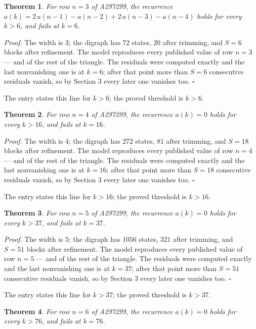 \documentclass[11pt]{article}
\newtheorem{theorem}{Theorem}
\theoremstyle{definition}
\begin{document}
\begin{theorem} For row $n = 3$ of A297299, the recurrence $a(k) = 2\,a(n-1) - a(n-2) + 2\,a(n-3) - a(n-4)$ holds for every $k > 6$, and fails at $k = 6$.\end{theorem}

{\itshape Proof.} The width is $3$; the digraph has $72$ states, $20$ after trimming, and $S = 6$ blocks after refinement. The model reproduces every published value of row $n = 3$ --- and of the rest of the triangle. The residuals were computed exactly and the last nonvanishing one is at $k = 6$; after that point more than $S = 6$ consecutive residuals vanish, so by Section 3 every later one vanishes too. $\square$

The entry states this line for $k > 6$; the proved threshold is $k > 6$.

\begin{theorem} For row $n = 4$ of A297299, the recurrence $a(k) = 0$ holds for every $k > 16$, and fails at $k = 16$.\end{theorem}

{\itshape Proof.} The width is $4$; the digraph has $272$ states, $81$ after trimming, and $S = 18$ blocks after refinement. The model reproduces every published value of row $n = 4$ --- and of the rest of the triangle. The residuals were computed exactly and the last nonvanishing one is at $k = 16$; after that point more than $S = 18$ consecutive residuals vanish, so by Section 3 every later one vanishes too. $\square$

The entry states this line for $k > 16$; the proved threshold is $k > 16$.

\begin{theorem} For row $n = 5$ of A297299, the recurrence $a(k) = 0$ holds for every $k > 37$, and fails at $k = 37$.\end{theorem}

{\itshape Proof.} The width is $5$; the digraph has $1056$ states, $321$ after trimming, and $S = 51$ blocks after refinement. The model reproduces every published value of row $n = 5$ --- and of the rest of the triangle. The residuals were computed exactly and the last nonvanishing one is at $k = 37$; after that point more than $S = 51$ consecutive residuals vanish, so by Section 3 every later one vanishes too. $\square$

The entry states this line for $k > 37$; the proved threshold is $k > 37$.

\begin{theorem} For row $n = 6$ of A297299, the recurrence $a(k) = 0$ holds for every $k > 76$, and fails at $k = 76$.\end{theorem}
\end{document}
